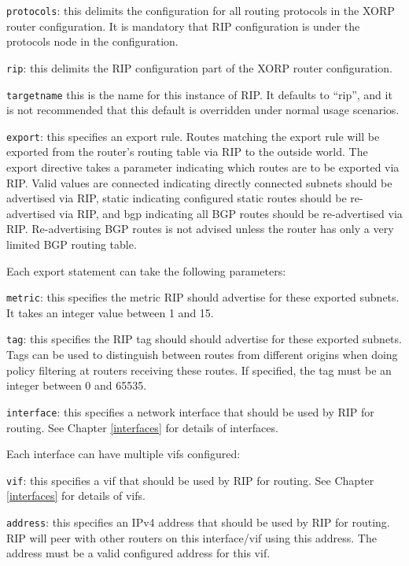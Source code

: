 \begin{description}
\item{\tt protocols}: this delimits the configuration for all routing
  protocols in the XORP router configuration.  It is mandatory that
  RIP configuration is under the {\stt protocols} node in the
  configuration.
\item{\tt rip}: this delimits the RIP configuration part of the XORP
  router configuration.
\item{\tt targetname} this is the name for this instance of RIP.  It
  defaults to ``{\stt rip}'', and it is not recommended that this
  default is overridden under normal usage scenarios.
\item{\tt export}: this specifies an export rule.  Routes matching the
  export rule will be exported from the router's routing table via RIP
  to the outside world.  The {\stt export} directive takes a parameter
  indicating which routes are to be exported via RIP.  Valid values
  are {\stt connected} indicating directly connected subnets should be
  advertised via RIP, {\stt static} indicating configured static
  routes should be re-advertised via RIP, and {\stt bgp} indicating
  all BGP routes should be re-advertised via RIP.  Re-advertising BGP
  routes is not advised unless the router has only a very limited BGP
  routing table.

  Each export statement can take the following parameters:
\begin{description}
\item{\tt metric}: this specifies the metric RIP should advertise for
these exported subnets.  It takes an integer value between 1 and 15. 
\item{\tt tag}: this specifies the RIP tag should should advertise for
  these exported subnets.  Tags can be used to distinguish between
  routes from different origins when doing policy filtering at routers
  receiving these routes.  If specified, the tag must be an integer
  between 0 and 65535.
\end{description}
\item{\tt interface}: this specifies a network interface that should
  be used by RIP for routing.  See Chapter \ref{interfaces} for
  details of interfaces.

  Each interface can have multiple vifs configured:
\item{\tt vif}: this specifies a vif that should be used by RIP for routing.
  See Chapter \ref{interfaces} for details of vifs.
\item{\tt address}: this specifies an IPv4 address that should be used
  by RIP for routing.  RIP will peer with other routers on this {\stt
  interface/vif} using this {\stt address}.  The address must be a
  valid configured address for this vif.


\end{description}
